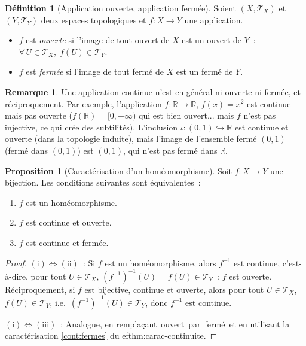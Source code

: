 \documentclass[12pt,a4paper,openany]{book}
\theoremstyle{definition}
\newtheorem{definition}{Définition}[chapter]
\theoremstyle{cours}
\newtheorem{proposition}[theoreme]{Proposition}
\theoremstyle{coursnormal}
\newtheorem{remarque}[theoreme]{Remarque}
\newcommand{\R}{\mathbb{R}}
\newcommand{\T}{\mathcal{T}}
\providecommand{\og}{\guillemotleft\,}
\providecommand{\fg}{\,\guillemotright}
\begin{document}
\begin{definition}[Application ouverte, application fermée]\label{def:ouverte-fermee}
  Soient $(X,\T_X)$ et $(Y,\T_Y)$ deux espaces topologiques et
  $f\colon X\to Y$ une application.
  \begin{itemize}
    \item $f$ est \emph{ouverte} si l'image de tout
      ouvert de $X$ est un ouvert de $Y$~: $\forall\, U\in\T_X,\;
      f(U)\in\T_Y$.
    \item $f$ est \emph{fermée} si l'image de tout
      fermé de $X$ est un fermé de $Y$.
  \end{itemize}
\end{definition}

\begin{remarque}
  Une application continue n'est en général ni ouverte ni fermée, et
  réciproquement. Par exemple, l'application $f\colon\R\to\R$,
  $f(x)=x^2$ est continue mais pas ouverte ($f(\R)=[0,+\infty)$ qui est
  bien ouvert... mais $f$ n'est pas injective, ce qui crée des
  subtilités). L'inclusion $\iota\colon(0,1)\hookrightarrow\R$ est
  continue et ouverte (dans la topologie induite), mais l'image de
  l'ensemble fermé $(0,1)$ (fermé dans $(0,1)$) est $(0,1)$, qui n'est
  pas fermé dans $\R$.
\end{remarque}

\begin{proposition}[Caractérisation d'un homéomorphisme]\label{prop:carac-homeo}
  Soit $f\colon X\to Y$ une bijection. Les conditions suivantes sont
  équivalentes~:
  \begin{enumerate}[label=\textup{(\roman*)}]
    \item $f$ est un homéomorphisme.
    \item $f$ est continue et ouverte.
    \item $f$ est continue et fermée.
  \end{enumerate}
\end{proposition}

\begin{proof}
  $\mathrm{(i)\Leftrightarrow(ii)}$~: Si $f$ est un homéomorphisme, alors
  $f^{-1}$ est continue, c'est-à-dire, pour tout $U\in\T_X$,
  $(f^{-1})^{-1}(U) = f(U)\in\T_Y$~: $f$ est ouverte. Réciproquement, si $f$
  est bijective, continue et ouverte, alors pour tout $U\in\T_X$,
  $f(U)\in\T_Y$, i.e.\ $(f^{-1})^{-1}(U)\in\T_Y$, donc $f^{-1}$ est
  continue.

  $\mathrm{(i)\Leftrightarrow(iii)}$~: Analogue, en remplaçant
  \og{}ouvert\fg{} par \og{}fermé\fg{} et en utilisant la caractérisation
  \ref{cont:fermes} du 
ef{thm:carac-continuite}.
\end{proof}
\end{document}

